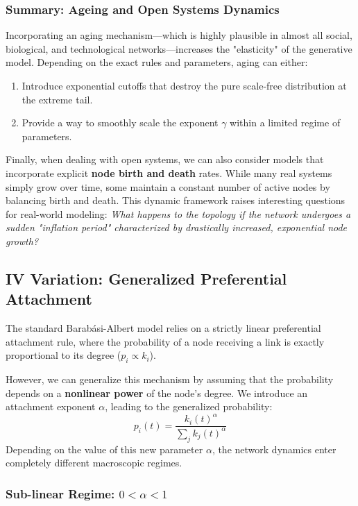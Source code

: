 \subsubsection{Summary: Ageing and Open Systems Dynamics}

Incorporating an aging mechanism—which is highly plausible in almost all social, biological, and technological networks—increases the "elasticity" of the generative model. Depending on the exact rules and parameters, aging can either:
\begin{enumerate}
    \item Introduce exponential cutoffs that destroy the pure scale-free distribution at the extreme tail.
    \item Provide a way to smoothly scale the exponent \( \gamma \) within a limited regime of parameters.
\end{enumerate}

Finally, when dealing with open systems, we can also consider models that incorporate explicit \textbf{node birth and death} rates. While many real systems simply grow over time, some maintain a constant number of active nodes by balancing birth and death.
This dynamic framework raises interesting questions for real-world modeling: \textit{What happens to the topology if the network undergoes a sudden "inflation period" characterized by drastically increased, exponential node growth?}

\subsection{IV Variation: Generalized Preferential Attachment}

The standard Barabási-Albert model relies on a strictly linear preferential attachment rule, where the probability of a node receiving a link is exactly proportional to its degree (\( p_i \propto k_i \)).

However, we can generalize this mechanism by assuming that the probability depends on a \textbf{nonlinear power} of the node's degree. We introduce an attachment exponent \( \alpha \), leading to the generalized probability:
\[
    p_i(t) = \frac{k_i(t)^\alpha}{\sum_j k_j(t)^\alpha}
\]
Depending on the value of this new parameter \( \alpha \), the network dynamics enter completely different macroscopic regimes.

\subsubsection{Sub-linear Regime: \( 0 < \alpha < 1 \)}

